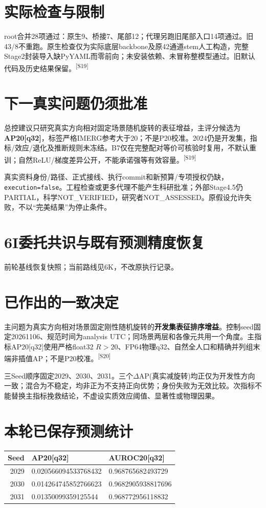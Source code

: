 \documentclass[UTF8,10.5pt,a4paper,fontset=none]{ctexart}
\newcommand{\evi}[1]{\textsuperscript{\color{muted}[#1]}}
\newcommand{\pageheading}[2]{\clearpage\section*{#1}\textcolor{muted}{#2}\par\vspace{3pt}}
\begin{document}
\section*{实际检查与限制}
root合并28项通过：原生9、桥接7、尾部12；代理另跑旧尾部入口14项通过。旧43/8不重跑。原生检查仅为实际底层backbone及原42通道stem人工构造，完整Stage2封装导入缺PyYAML而零前向；未安装依赖、未冒称整模型通过。旧默认代码及历史结果保留。\evi{S19}

\section*{下一真实问题仍须批准}
总控建议只研究真实方向相对固定场景随机旋转的表征增益，主评分候选为\textbf{AP20[q32]}，标签严格IMERG参考大于20；不是P20校准。2024仍是开发集，指标/效应/退化及推断规则未冻结。B7仅在完整配对等价可核验时复用，不默认重训；自然ReLU/梯度差异公开，不能承诺强等有效容量。\evi{S19}

真实资料身份/路径、正式接线、执行commit和新预算/专项授权仍缺，\texttt{execution=false}。工程检查或更多代理不能产生科研批准；外部Stage4.5仍PARTIAL，科学NOT\_VERIFIED，研究者NOT\_ASSESSED。原假设允许失败，不以“完美结果”为停止条件。

\pageheading{6I\quad 委托共识与既有预测精度恢复}{前轮基线恢复快照；当前路线见6K，不改原执行记录。}
\section*{已作出的一致决定}
主问题为真实方向相对场景固定刚性随机旋转的\textbf{开发集表征排序增益}。控制seed固定20261106、规范时间为analysis UTC；同场景两层和各像元共用一个角度。主指标AP20[q32]使用严格float32 $R>20$、FP64物理q32、自然全人口和精确并列组末端非插值AP；不是P20校准。\evi{S20}

三Seed顺序固定2029、2030、2031。三个$\Delta$AP(真实减旋转)均正仅为开发性方向一致；混合为不稳定，均非正为不支持正向优势；身份失败为无效比较。次指标不能替换主指标挽救结论，不虚设实质效应阈值、显著性或物理因果。

\section*{本轮已保存预测统计}
\begin{tabular}{rll}\toprule Seed & AP20[q32] & AUROC20[q32] \\ \midrule
2029 & 0.020566094533768432 & 0.968765682493729 \\
2030 & 0.014264745852766623 & 0.9682905938817696 \\
2031 & 0.01350099359125544 & 0.968772956118832 \\
\bottomrule\end{tabular}
\end{document}

